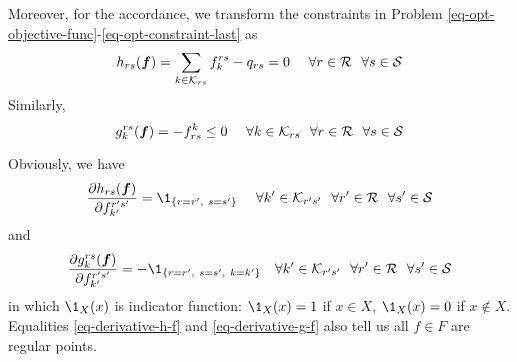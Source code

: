 \documentclass{article}
\begin{document}
Moreover, for the accordance, we transform the constraints in Problem \ref{eq-opt-objective-func}-\ref{eq-opt-constraint-last} as
\begin{equation}
    h_{rs} (\boldsymbol{f}) = \sum_{k \in \mathcal{K}_{rs}} f_k^{rs} - q_{rs} = 0 ~~~~ \forall r \in \mathcal{R} ~~ \forall s \in \mathcal{S} 
\end{equation}
Similarly, 
\begin{equation}
    g^{rs}_k (\boldsymbol{f}) = - f_{rs}^k \le 0 ~~~~ \forall k \in \mathcal{K}_{rs} ~~ \forall r \in \mathcal{R} ~~ \forall s \in \mathcal{S}
\end{equation}

Obviously, we have
\begin{equation} \label{eq-derivative-h-f}
    \frac{\partial h_{rs} (\boldsymbol{f})}{\partial f_{k'}^{r's'}} = \1_{\{ r = r', ~s = s' \}} ~~~~ \forall k' \in \cK_{r's'} ~~ \forall r' \in \cR ~~ \forall s' \in \cS
\end{equation}
and
\begin{equation} \label{eq-derivative-g-f}
    \frac{\partial g_k^{rs} (\boldsymbol{f})}{\partial f_{k'}^{r's'}} = - \1_{\{r=r', ~s=s', ~k=k'\}} ~~~ \forall k' \in \cK_{r's'} ~~ \forall r' \in \cR ~~ \forall s' \in \cS
\end{equation}
in which $ \1_X (x) $ is indicator function: $ \1_X (x) = 1 $ if $ x \in X $, $ \1_X (x) = 0 $ if $ x \notin X $. Equalities \ref{eq-derivative-h-f} and \ref{eq-derivative-g-f} also tell us all $ f \in F $ are regular points.
\end{document}
